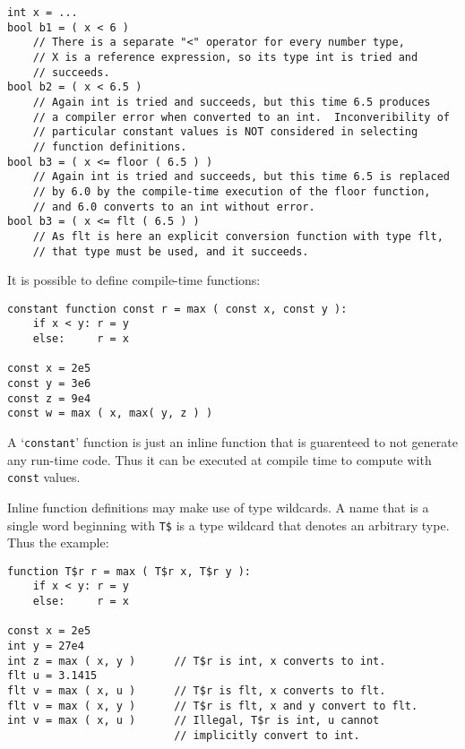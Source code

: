 \documentclass[12pt]{article}
\newenvironment{indpar}[1][0.3in]%
	{\begin{list}{}%
		     {\setlength{\itemsep}{0in}%
		      \setlength{\topsep}{0in}%
		      \setlength{\parsep}{1ex}%
		      \setlength{\labelwidth}{#1}%
		      \setlength{\leftmargin}{#1}%
		      \addtolength{\leftmargin}{\labelsep}}%
	 \item}%
	{\end{list}}
\begin{document}
\begin{indpar}\begin{verbatim}
int x = ...
bool b1 = ( x < 6 )
    // There is a separate "<" operator for every number type,
    // X is a reference expression, so its type int is tried and
    // succeeds.
bool b2 = ( x < 6.5 )
    // Again int is tried and succeeds, but this time 6.5 produces
    // a compiler error when converted to an int.  Inconveribility of
    // particular constant values is NOT considered in selecting
    // function definitions.
bool b3 = ( x <= floor ( 6.5 ) )
    // Again int is tried and succeeds, but this time 6.5 is replaced
    // by 6.0 by the compile-time execution of the floor function,
    // and 6.0 converts to an int without error.
bool b3 = ( x <= flt ( 6.5 ) )
    // As flt is here an explicit conversion function with type flt,
    // that type must be used, and it succeeds.
\end{verbatim}\end{indpar}

It is possible to define compile-time functions:

\begin{indpar}\begin{verbatim}
constant function const r = max ( const x, const y ):
    if x < y: r = y
    else:     r = x

const x = 2e5
const y = 3e6
const z = 9e4
const w = max ( x, max( y, z ) )
\end{verbatim}\end{indpar}

A `{\tt constant}' function is just an inline function that
is guarenteed to not generate any run-time code.
Thus it can be executed at compile time to compute with
{\tt const} values.

Inline function definitions may make use of type wildcards.
A name that is a single word beginning with {\tt T\$}
is a type wildcard that denotes
an arbitrary type.  Thus the example:

\begin{indpar}\begin{verbatim}
function T$r r = max ( T$r x, T$r y ):
    if x < y: r = y
    else:     r = x

const x = 2e5
int y = 27e4
int z = max ( x, y )      // T$r is int, x converts to int.
flt u = 3.1415
flt v = max ( x, u )      // T$r is flt, x converts to flt.
flt v = max ( x, y )      // T$r is flt, x and y convert to flt.
int v = max ( x, u )      // Illegal, T$r is int, u cannot
                          // implicitly convert to int.
\end{verbatim}\end{indpar}
\end{document}
